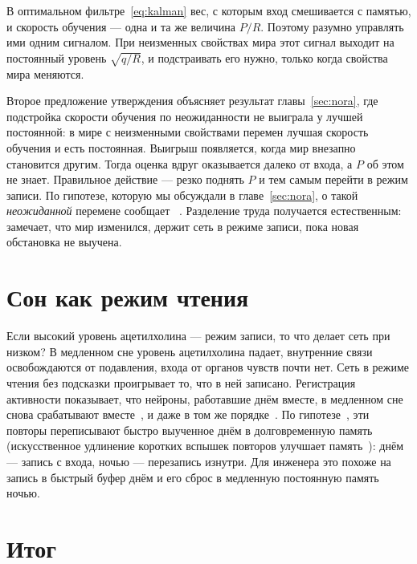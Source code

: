 \begin{keyblock}
\begin{proposition}
\label{prop:kalman}
В оптимальном фильтре~\eqref{eq:kalman} вес, с которым вход смешивается с памятью, и скорость обучения --- одна и та же величина $P/R$. Поэтому разумно управлять ими одним сигналом. При неизменных свойствах мира этот сигнал выходит на постоянный уровень $\sqrt{q/R}$, и подстраивать его нужно, только когда свойства мира меняются.
\end{proposition}
\end{keyblock}

Второе предложение утверждения объясняет результат главы~\ref{sec:nora}, где подстройка скорости обучения по неожиданности не выиграла у лучшей постоянной: в мире с неизменными свойствами перемен лучшая скорость обучения и есть постоянная. Выигрыш появляется, когда мир внезапно становится другим. Тогда оценка вдруг оказывается далеко от входа, а $P$ об этом не знает. Правильное действие --- резко поднять $P$ и тем самым перейти в режим записи. По гипотезе, которую мы обсуждали в главе~\ref{sec:nora}, о такой \emph{неожиданной} перемене сообщает ~\cite{YuDayan2005}. Разделение труда получается естественным:  замечает, что мир изменился,  держит сеть в режиме записи, пока новая обстановка не выучена.

\section{Сон как режим чтения}

Если высокий уровень ацетилхолина --- режим записи, то что делает сеть при низком? В медленном сне уровень ацетилхолина падает, внутренние связи освобождаются от подавления, входа от органов чувств почти нет. Сеть в режиме чтения без подсказки проигрывает то, что в ней записано. Регистрация активности показывает, что нейроны, работавшие днём вместе, в медленном сне снова срабатывают вместе~\cite{WilsonMcNaughton1994}, и даже в том же порядке~\cite{Skaggs1996}. По гипотезе~\cite{Hasselmo1999}, эти повторы переписывают быстро выученное днём в долговременную память (искусственное удлинение коротких вспышек повторов улучшает память~\cite{FernandezRuiz2019}): днём --- запись с входа, ночью --- перезапись изнутри. Для инженера это похоже на запись в быстрый буфер днём и его сброс в медленную постоянную память ночью.

\section{Итог}

